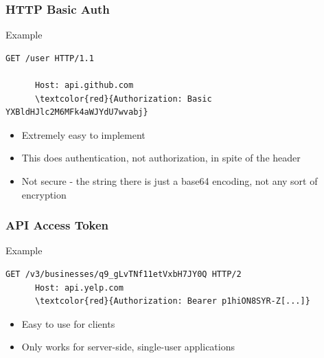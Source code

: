 \documentclass[dvipsnames]{beamer}
\begin{document}
\begin{frame}[fragile=singleslide]
  \frametitle{HTTP Basic Auth}
  \begin{block}{Example}
    \begin{Verbatim}[commandchars=\\\{\}]
      GET /user HTTP/1.1
      
      Host: api.github.com
      \textcolor{red}{Authorization: Basic YXBldHJlc2M6MFk4aWJYdU7wvabj}
    \end{Verbatim}
  \end{block}

    \begin{itemize}
      \item Extremely easy to implement
      \item This does authentication, not authorization, in spite of the header
      \item Not secure - the string there is just a base64 encoding, not any sort of encryption
    \end{itemize}
\end{frame}


\begin{frame}[fragile=singleslide]
  \frametitle{API Access Token}
  \begin{block}{Example}
    \begin{Verbatim}[commandchars=\\\{\}]
      GET /v3/businesses/q9_gLvTNf11etVxbH7JY0Q HTTP/2
      Host: api.yelp.com
      \textcolor{red}{Authorization: Bearer p1hiON8SYR-Z[...]}
    \end{Verbatim}
  \end{block}
  
  \begin{itemize}
    \item Easy to use for clients
    \item Only works for server-side, single-user applications
  \end{itemize}
\end{frame}
\end{document}
